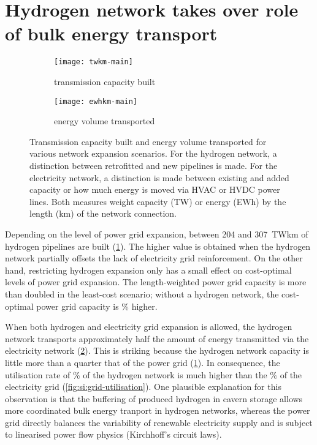 \section*{Hydrogen network takes over role of bulk energy transport}
\label{sec:energy-moved}

\begin{figure}
    \centering
        \begin{subfigure}[t]{0.49\textwidth}
            \centering
            \caption{transmission capacity built}
            \texttt{[image: twkm-main]}
            \label{fig:network-stats:twkm}
        \end{subfigure}
        \begin{subfigure}[t]{0.49\textwidth}
            \centering
            \caption{energy volume transported}
            \texttt{[image: ewhkm-main]}
            \label{fig:network-stats:ewhkm}
        \end{subfigure}
    \caption{Transmission capacity built and energy volume transported for
        various network expansion scenarios. For the hydrogen network, a
        distinction between retrofitted and new pipelines is made. For the
        electricity network, a distinction is made between existing and added
        capacity or how much energy is moved via HVAC or HVDC power lines. Both
        measures weight capacity (TW) or energy (EWh) by the length (km) of the
        network connection.}
    \label{fig:network-stats}
\end{figure}

Depending on the level of power grid expansion, between 204 and 307~TWkm of
hydrogen pipelines are built (\cref{fig:network-stats:twkm}). The higher value
is obtained when the hydrogen network partially offsets the lack of electricity
grid reinforcement. On the other hand, restricting hydrogen expansion only has a
small effect on cost-optimal levels of power grid expansion. The length-weighted
power grid capacity is more than doubled in the least-cost scenario; without a
hydrogen network, the cost-optimal power grid capacity is \twkmhigher\% higher.

When both hydrogen and electricity grid expansion is allowed, the hydrogen
network transports approximately half the amount of energy transmitted via the
electricity network (\cref{fig:network-stats:ewhkm}). This is striking because
the hydrogen network capacity is little more than a quarter that of the power
grid (\cref{fig:network-stats:twkm}). In consequence, the utilisation rate of
\utilisationHy\% of the hydrogen network is much higher than the
\utilisationAC\% of the electricity grid (\cref{fig:si:grid-utilisation}). One
plausible explanation for this observation is that the buffering of produced
hydrogen in cavern storage allows more coordinated bulk energy tranport in
hydrogen networks, whereas the power grid directly balances the variability of
renewable electricity supply and is subject to linearised power flow physics
(Kirchhoff's circuit laws).

